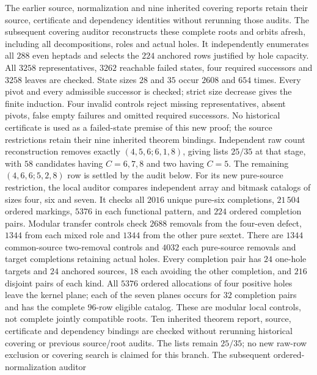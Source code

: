 The earlier source, normalization and nine inherited covering
reports retain their source, certificate and dependency identities
without rerunning those audits.
The subsequent covering auditor
reconstructs these complete roots and orbits afresh, including
all decompositions, roles and actual holes. It independently
enumerates all $288$ even heptads and selects the $224$ anchored
rows justified by hole capacity. All $3258$ representatives,
$3262$ reachable failed states, four required successors and
$3258$ leaves are checked. State sizes $28$ and $35$ occur
$2608$ and $654$ times. Every pivot and every admissible successor
is checked; strict size decrease gives the finite induction.
Four invalid controls reject missing representatives, absent pivots,
false empty failures and omitted required successors. No historical
certificate is used as a failed-state premise of this new proof;
the source restrictions retain their nine inherited theorem bindings.
Independent raw count reconstruction removes exactly
$(4,5,6;6,1,8)$, giving lists $25/35$ at that stage, with $58$
candidates having $C=6,7,8$ and two having $C=5$.
The remaining $(4,6,6;5,2,8)$ row is settled by the audit below.
For its new pure-source restriction, the local auditor
compares independent array and bitmask catalogs of sizes four,
six and seven. It checks all $2016$ unique pure-six completions,
$21\,504$ ordered markings, $5376$ in each functional pattern,
and $224$ ordered completion pairs. Modular transfer controls
check $2688$ removals from the four-even defect, $1344$ from
each mixed role and $1344$ from the other pure sextet.
There are $1344$ common-source two-removal controls and $4032$
each pure-source removals and target completions retaining actual
holes. Every completion pair has $24$ one-hole targets and
$24$ anchored sources, $18$ each avoiding the other completion,
and $216$ disjoint pairs of each kind. All $5376$ ordered
allocations of four positive holes leave the kernel plane;
each of the seven planes occurs for $32$ completion pairs and
has the complete $96$-row eligible catalog. These are modular
local controls, not complete jointly compatible roots.
Ten inherited theorem report, source, certificate and dependency
bindings are checked without rerunning historical covering or
previous source/root audits. The lists remain $25/35$; no new
raw-row exclusion or covering search is claimed for this branch.
The subsequent ordered-normalization auditor
